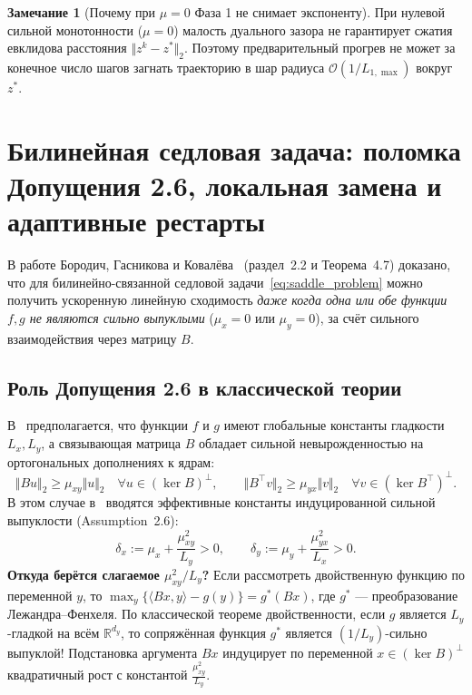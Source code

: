 \documentclass[11pt, a4paper]{article}
\theoremstyle{definition}
\newtheorem{remark}{Замечание}[section]
\begin{document}
\begin{remark}[Почему при $\mu = 0$ Фаза 1 не снимает экспоненту]
При нулевой сильной монотонности ($\mu = 0$) малость дуального зазора не гарантирует сжатия евклидова расстояния $\Vert z^k - z^* \Vert_2$. Поэтому предварительный прогрев не может за конечное число шагов загнать траекторию в шар радиуса $\mathcal{O}(1/L_{1,\max})$ вокруг $z^*$.
\end{remark}

\section{Билинейная седловая задача: поломка Допущения 2.6, локальная замена и адаптивные рестарты}

В работе Бородич, Гасникова и Ковалёва~\cite{Borodich2025} (раздел~2.2 и Теорема~4.7) доказано, что для билинейно-связанной седловой задачи~\eqref{eq:saddle_problem} можно получить ускоренную линейную сходимость \emph{даже когда одна или обе функции $f, g$ не являются сильно выпуклыми} ($\mu_x = 0$ или $\mu_y = 0$), за счёт сильного взаимодействия через матрицу $B$.

\subsection{Роль Допущения 2.6 в классической теории}

В~\cite{Borodich2025} предполагается, что функции $f$ и $g$ имеют глобальные константы гладкости $L_x, L_y$, а связывающая матрица $B$ обладает сильной невырожденностью на ортогональных дополнениях к ядрам:
\[
\Vert B u \Vert_2 \ge \mu_{xy} \Vert u \Vert_2 \quad \forall u \in (\ker B)^\perp, \qquad \Vert B^\top v \Vert_2 \ge \mu_{yx} \Vert v \Vert_2 \quad \forall v \in (\ker B^\top)^\perp.
\]
В этом случае в~\cite{Borodich2025} вводятся эффективные константы индуцированной сильной выпуклости (Assumption~2.6):
\begin{equation}\label{eq:borodich_delta_classical}
\delta_x := \mu_x + \frac{\mu_{xy}^2}{L_y} > 0, \qquad \delta_y := \mu_y + \frac{\mu_{yx}^2}{L_x} > 0.
\end{equation}
\textbf{Откуда берётся слагаемое $\mu_{xy}^2 / L_y$?} Если рассмотреть двойственную функцию по переменной $y$, то $\max_y \{\langle B x, y \rangle - g(y)\} = g^*(B x)$, где $g^*$ --- преобразование Лежандра--Фенхеля. По классической теореме двойственности, если $g$ является $L_y$-гладкой на всём $\mathbb{R}^{d_y}$, то сопряжённая функция $g^*$ является $(1/L_y)$-сильно выпуклой! Подстановка аргумента $B x$ индуцирует по переменной $x \in (\ker B)^\perp$ квадратичный рост с константой $\frac{\mu_{xy}^2}{L_y}$.
\end{document}
